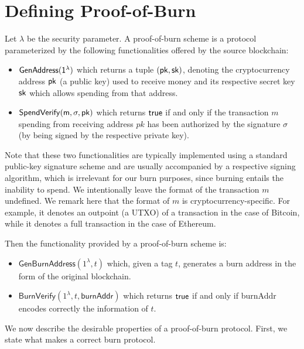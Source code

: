 \section{Defining Proof-of-Burn}

Let $\lambda$ be the security parameter. A proof-of-burn scheme is a protocol parameterized by the following functionalities offered by the source blockchain:

\begin{itemize}
  \item $\sf{GenAddress}(1^\lambda)$ which returns a tuple $(\sf{pk}, \sf{sk})$, denoting the cryptocurrency address $\sf{pk}$ (a public key) used to receive money and its respective secret key $\sf{sk}$ which allows spending from that address.

  \item $\sf{SpendVerify}(m, \sigma, pk)$ which returns $\sf{true}$ if and only if the transaction $m$ spending from receiving address $pk$ has been authorized by the signature $\sigma$ (by being signed by the respective private key).
\end{itemize}

Note that these two functionalities are typically implemented using a standard public-key signature scheme and are usually accompanied by a respective signing algorithm, which is irrelevant for our burn purposes, since burning entails the inability to spend. We intentionally leave the format of the transaction $m$ undefined. We remark here that the format of $m$ is cryptocurrency-specific. For example, it denotes an outpoint (a UTXO) of a transaction in the case of Bitcoin, while it denotes a full transaction in the case of Ethereum.

Then the functionality provided by a proof-of-burn scheme is:

\begin{itemize}
  \item $\mathsf{GenBurnAddress}(1^\lambda, t)$ which, given a tag $t$, generates a burn address in the form of the original blockchain.

  \item $\mathsf{BurnVerify}(1^\lambda, t, \mathsf{burnAddr})$ which returns $\sf{true}$ if and only if \textsf{burnAddr} encodes correctly the information of $t$.
\end{itemize}

We now describe the desirable properties of a proof-of-burn protocol. First, we state what makes a correct burn protocol.

